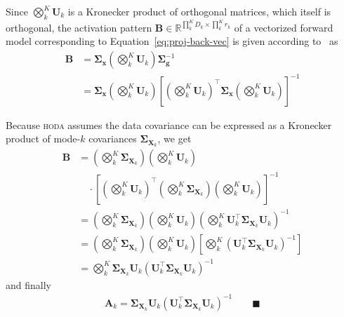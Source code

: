 \documentclass[twocolumn]{article}
\newcommand{\mat}[1]{\mathbf{#1}} %
\renewcommand{\vec}[1]{\mathbf{#1}} %
\begin{document}
Since $\bigotimes_k^K\mat{U}_k$ is a Kronecker product of orthogonal matrices,
which itself is orthogonal, the activation pattern
$\mat{B}\in\mathbb{R}^{\prod_k^KD_k\times\prod_k^Kr_k} $ of a vectorized forward model
corresponding to Equation~\ref{eq:proj-back-vec} is given according
to~\cite{Haufe2014} as
\begin{align*}
	\mat{B} & =
	\mat{\Sigma}_\vec{x}\left(\bigotimes_k^K\mat{U}_k\right)\mat{\Sigma}_\vec{g}^{-1} \\
	        & =
	\mat{\Sigma}_\vec{x}\left(\bigotimes_k^K\mat{U}_k\right)\left[\left(\bigotimes_k^K\mat{U}_k\right)^\intercal\mat{\Sigma_\vec{x}}\left(\bigotimes_k^K\mat{U}_k\right)\right]^{-1}
\end{align*}

Because \textsc{hoda} assumes the data covariance can be expressed as a
Kronecker product of mode-$k$ covariances
$\mat{\Sigma}_{\mat{X}_k}$, we get
\begin{align*}
	\mat{B} & =
	\left(\bigotimes_k^K\mat{\Sigma}_{\mat{X}_k}\right)\left(\bigotimes_k^K\mat{U}_k\right)
  \\
          & \quad \cdot
          \left[\left(\bigotimes_k^K\mat{U}_k\right)^\intercal\left(\bigotimes_k^K\mat{\Sigma}_{\mat{X}_k}\right)\left(\bigotimes_k^K\mat{U}_k\right)\right]^{-1}
	\\
	        &
	=\left(\bigotimes_k^K\mat{\Sigma}_{\mat{X}_k}\right)\left(\bigotimes_k^K\mat{U}_k\right)\left(\bigotimes_k^K\mat{U}_k^\intercal\mat{\Sigma}_{\mat{X}_k}\mat{U}_k\right)^{-1} \\
	        &
	=\left(\bigotimes_k^K\mat{\Sigma}_{\mat{X}_k}\right)\left(\bigotimes_k^K\mat{U}_k\right)\left[\bigotimes_k^K\left(\mat{U}_k^\intercal\mat{\Sigma}_{\mat{X}_k}\mat{U}_k\right)^{-1}\right]
	\\
	        & = \bigotimes_k^K \mat{\Sigma}_{\mat{X}_k}
	\mat{U}_k\left(\mat{U}_k^\intercal\mat{\Sigma}_{\mat{X}_k}\mat{U}_k\right)^{-1}
\end{align*}
and finally
\begin{align*}
  \mat{A}_k = \mat{\Sigma}_{\mat{X}_k}
	\mat{U}_k\left(\mat{U}_k^\intercal\mat{\Sigma}_{\mat{X}_k}\mat{U}_k\right)^{-1}
\qquad\blacksquare
\end{align*}
\end{document}
